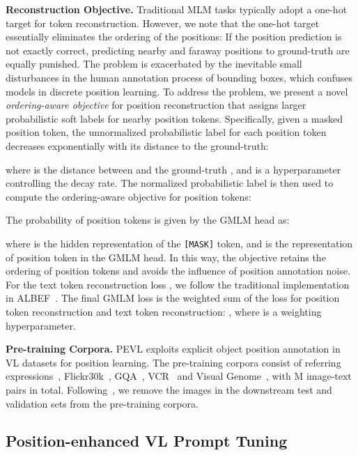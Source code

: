\documentclass[11pt]{article}
\begin{document}
\smallskip
\textbf{Reconstruction Objective.} Traditional MLM tasks typically adopt a one-hot target for token reconstruction. However, we note that the one-hot target essentially eliminates the ordering of the positions: If the position prediction is not exactly correct, predicting nearby and faraway positions to ground-truth are equally punished. The problem is exacerbated by the inevitable small disturbances in the human annotation process of bounding boxes, which confuses models in discrete position learning. To address the problem, we present a novel \textit{ordering-aware objective} for position reconstruction that assigns larger probabilistic soft labels for nearby position tokens. Specifically, given a masked position token, the unnormalized probabilistic label  for each position token  decreases exponentially with its distance to the ground-truth:

where  is the distance between  and the ground-truth , and  is a hyperparameter controlling the decay rate. The normalized probabilistic label  is then used to compute the ordering-aware objective for position tokens:



The probability of position tokens is given by the GMLM head as:


where  is the hidden representation of the \texttt{[MASK]} token, and  is the representation of position token  in the GMLM head. In this way, the objective retains the ordering of position tokens and avoids the influence of position annotation noise. For the text token reconstruction loss , we follow the traditional implementation in ALBEF~\cite{li2021align}. The final GMLM loss is the weighted sum of the loss for position token reconstruction and text token reconstruction: , where  is a weighting hyperparameter.



\smallskip
\textbf{Pre-training Corpora.} PEVL exploits explicit object position annotation in VL datasets for position learning. The pre-training corpora consist of referring expressions~\cite{yu2016modeling,mao2016generation}, Flickr30k~\cite{plummer2015flickr30k}, GQA~\cite{hudson2019gqa}, VCR~\cite{zellers2019recognition} and Visual Genome~\cite{krishna2017visual}, with M image-text pairs in total. Following~\citet{chen2020uniter}, we remove the images in the downstream test and validation sets from the pre-training corpora.


\subsection{Position-enhanced VL Prompt Tuning}
\label{sec:prompt tuning}
\end{document}
